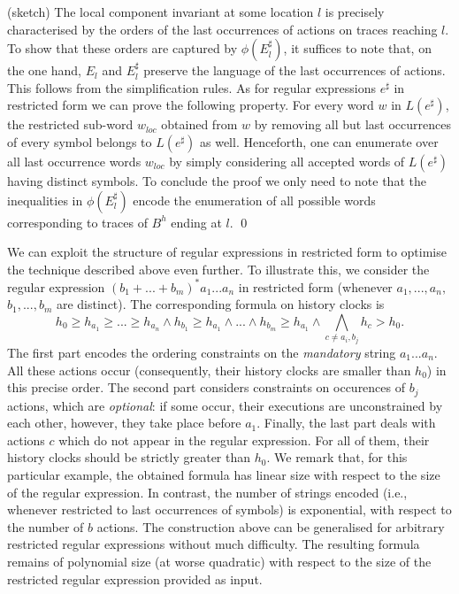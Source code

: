 \documentclass{LMCS}
\newcommand{\cn}{\mathit{B}\xspace}
\newcommand{\te}{h_0}
\theoremstyle{plain}\newtheorem{remark}[thm]{Remark}
\theoremstyle{plain}\newtheorem{example}[thm]{Example}
\begin{document}
\proof (sketch) The local component invariant at some location $l$ is
precisely characterised by the orders of the last occurrences of
actions on traces reaching $l$. To show that these orders are captured
by $\phi(E_l^{\sharp})$, it suffices to note that, on the one hand,
$E_l$ and $E_l^{\sharp}$ preserve the language of the last occurrences
of actions. This follows from the simplification rules. As for regular
expressions $e^{\sharp}$ in restricted form we can prove the following
property.  For every word $w$ in $L(e^\sharp)$, the restricted
sub-word $w_{loc}$ obtained from $w$ by removing all but last
occurrences of every symbol belongs to $L(e^\sharp)$ as well.
Henceforth, one can enumerate over all last occurrence words $w_{loc}$
by simply considering all accepted words of $L(e^\sharp)$ having
distinct symbols. To conclude the proof we only need to note that
the inequalities in $\phi(E_l^{\sharp})$ encode the enumeration of all
possible words corresponding to traces of $\cn^h$ ending at $l$. \qed


We can exploit the structure of regular expressions in restricted form
to optimise the technique described above even further. To illustrate
this, we consider the regular expression $(b_1 + ... + b_m)^*
a_1...a_n$ in restricted form (whenever $a_1, ..., a_n,$ $b_1, ...,
b_m$ are distinct).  The corresponding formula on history clocks is
\[\te \geq h_{a_1} \geq ... \geq h_{a_n} \wedge h_{b_1} \ge h_{a_1} \wedge ... \wedge h_{b_m} \ge h_{a_1} 
\wedge \bigwedge\limits_{c\not=a_i,b_j} h_c > \te. \] The first part
encodes the ordering constraints on the {\em mandatory} string
$a_1...a_n$. All these actions occur (consequently, their history
clocks are smaller than $\te$) in this precise order. The second part
considers constraints on occurences of $b_j$ actions, which are {\em
  optional}: if some occur, their executions are unconstrained by each
other, however, they take place before $a_1$.  Finally, the last part
deals with actions $c$ which do not appear in the regular expression.
For all of them, their history clocks should be strictly greater than
$\te$.  We remark that, for this particular example, the obtained
formula has linear size with respect to the size of the regular
expression. In contrast, the number of strings encoded (i.e., whenever
restricted to last occurrences of symbols) is exponential, with
respect to the number of $b$ actions.  The construction above can be
generalised for arbitrary restricted regular expressions without much
difficulty.  The resulting formula remains of polynomial size (at
worse quadratic) with respect to the size of the restricted regular
expression provided as input.
\end{document}
